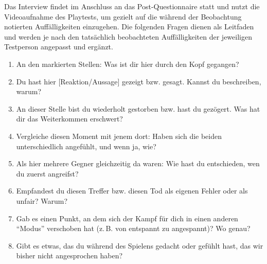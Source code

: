 \documentclass[../Main.tex]{subfiles}
\begin{document}
Das Interview findet im Anschluss an das Post-Questionnaire statt und nutzt die Videoaufnahme des Playtests, um gezielt auf die während der Beobachtung notierten Auffälligkeiten einzugehen. Die folgenden Fragen dienen als Leitfaden und werden je nach den tatsächlich beobachteten Auffälligkeiten der jeweiligen Testperson angepasst und ergänzt.
 
\begin{enumerate}[label=\textbf{I\arabic*}, leftmargin=1.5cm, itemsep=0.5em]
    \item An den markierten Stellen: Was ist dir hier durch den Kopf gegangen?
    \item Du hast hier [Reaktion/Aussage] gezeigt bzw. gesagt. Kannst du beschreiben, warum?
    \item An dieser Stelle bist du wiederholt gestorben bzw. hast du gezögert. Was hat dir das Weiterkommen erschwert?
    \item Vergleiche diesen Moment mit jenem dort: Haben sich die beiden unterschiedlich angefühlt, und wenn ja, wie?
    \item Als hier mehrere Gegner gleichzeitig da waren: Wie hast du entschieden, wen du zuerst angreifst?
    \item Empfandest du diesen Treffer bzw. diesen Tod als eigenen Fehler oder als unfair? Warum?
    \item Gab es einen Punkt, an dem sich der Kampf für dich in einen anderen \enquote{Modus} verschoben hat (z.\,B. von entspannt zu angespannt)? Wo genau?
    \item Gibt es etwas, das du während des Spielens gedacht oder gefühlt hast, das wir bisher nicht angesprochen haben?
\end{enumerate}
\end{document}
